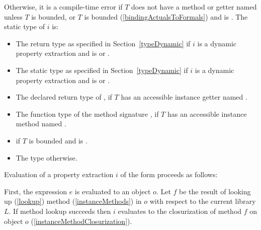 \documentclass[makeidx]{article}
\begin{document}
{\LMHash{}%
Otherwise, it is a compile-time error if $T$ does not have
a method or getter named \id{}
unless $T$ is \DYNAMIC{} bounded,
or $T$ is \FUNCTION{} bounded
(\ref{bindingActualsToFormals})
and \id{} is \CALL.
The static type of $i$ is:

\begin{itemize}
\item The return type as specified in Section~\ref{typeDynamic}
  if $i$ is a dynamic  property extraction
  and \id{} is  or .
\item The static type as specified in Section~\ref{typeDynamic}
  if $i$ is a dynamic  property extraction
  and \id{} is  or .
\item The declared return type of ,
  if $T$ has an accessible instance getter named \id.
\item The function type of the method signature ,
  if $T$ has an accessible instance method named \id.
\item \FUNCTION{} if $T$ is \FUNCTION{} bounded and \id{} is \CALL.
\item The type \DYNAMIC{} otherwise.
\end{itemize}


\LMHash{}%
Evaluation of a property extraction $i$ of the form 
proceeds as follows:

\LMHash{}%
First, the expression $e$ is evaluated to an object $o$.
Let $f$ be the result of looking up (\ref{lookup}) method
(\ref{instanceMethods})
\id{} in $o$ with respect to the current library $L$.
If method lookup succeeds then $i$ evaluates to
the closurization of method $f$ on object $o$
(\ref{instanceMethodClosurization}).


}
\end{document}
